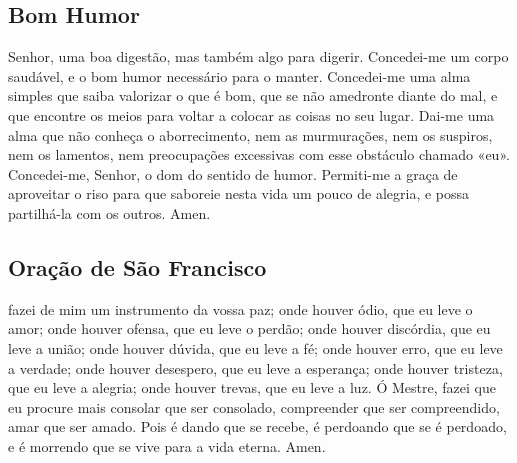 \subsection{Bom Humor}
 Senhor, uma boa digestão, mas também algo para digerir. Concedei-me um corpo saudável, e o bom humor necessário para o manter. Concedei-me uma alma simples que saiba valorizar o que é bom, que se não amedronte diante do mal, e que encontre os meios para voltar a colocar as coisas no seu lugar. Dai-me uma alma que não conheça o aborrecimento, nem as murmurações, nem os suspiros, nem os lamentos, nem preocupações excessivas com esse obstáculo chamado «eu». Concedei-me, Senhor, o dom do sentido de humor. Permiti-me a graça de aproveitar o riso para que saboreie nesta vida um pouco de alegria, e possa partilhá-la com os outros. Amen.

\subsection{Oração de São Francisco}
 fazei de mim um instrumento da vossa paz; onde houver ódio, que eu leve o amor; onde houver ofensa, que eu leve o perdão; onde houver discórdia, que eu leve a união; onde houver dúvida, que eu leve a fé; onde houver erro, que eu leve a verdade; onde houver desespero, que eu leve a esperança; onde houver tristeza, que eu leve a alegria; onde houver trevas, que eu leve a luz. Ó Mestre, fazei que eu procure mais consolar que ser consolado, compreender que ser compreendido, amar que ser amado. Pois é dando que se recebe, é perdoando que se é perdoado, e é morrendo que se vive para a vida eterna. Amen.

